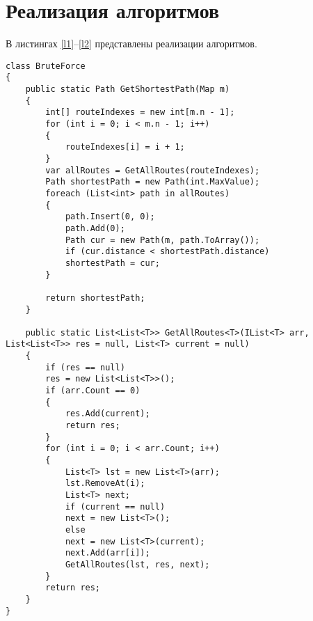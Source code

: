\section{Реализация алгоритмов}
В листингах \ref{l1}--\ref{l2} представлены реализации алгоритмов. 
\begin{center}
\begin{lstlisting}[label=l1, caption={Реалитзация алгоритма полного перебора}]
 class BruteForce
{
	public static Path GetShortestPath(Map m)
	{
		int[] routeIndexes = new int[m.n - 1];
		for (int i = 0; i < m.n - 1; i++)
		{
			routeIndexes[i] = i + 1;
		}
		var allRoutes = GetAllRoutes(routeIndexes); 
		Path shortestPath = new Path(int.MaxValue);
		foreach (List<int> path in allRoutes)
		{
			path.Insert(0, 0);
			path.Add(0);
			Path cur = new Path(m, path.ToArray());
			if (cur.distance < shortestPath.distance)
			shortestPath = cur;
		}
		
		return shortestPath;
	}
	
	public static List<List<T>> GetAllRoutes<T>(IList<T> arr, List<List<T>> res = null, List<T> current = null)
	{
		if (res == null)
		res = new List<List<T>>();
		if (arr.Count == 0) 
		{
			res.Add(current);
			return res;
		}
		for (int i = 0; i < arr.Count; i++)
		{
			List<T> lst = new List<T>(arr);
			lst.RemoveAt(i);
			List<T> next;
			if (current == null)
			next = new List<T>();
			else
			next = new List<T>(current);
			next.Add(arr[i]);
			GetAllRoutes(lst, res, next);
		}
		return res;
	}
}
\end{lstlisting}
\end{center}
